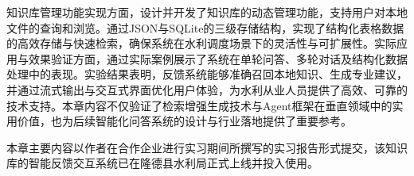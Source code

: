 知识库管理功能实现方面，设计并开发了知识库的动态管理功能，支持用户对本地文件的查询和浏览。通过JSON与SQLite的三级存储结构，实现了结构化表格数据的高效存储与快速检索，确保系统在水利调度场景下的灵活性与可扩展性。实际应用与效果验证方面，通过实际案例展示了系统在单轮问答、多轮对话及结构化数据处理中的表现。实验结果表明，反馈系统能够准确召回本地知识、生成专业建议，并通过流式输出与交互式界面优化用户体验，为水利从业人员提供了高效、可靠的技术支持。本章内容不仅验证了检索增强生成技术与Agent框架在垂直领域中的实用价值，也为后续智能化问答系统的设计与行业落地提供了重要参考。

本章主要内容以作者在合作企业进行实习期间所撰写的实习报告形式提交，该知识库的智能反馈交互系统已在隆德县水利局正式上线并投入使用。
